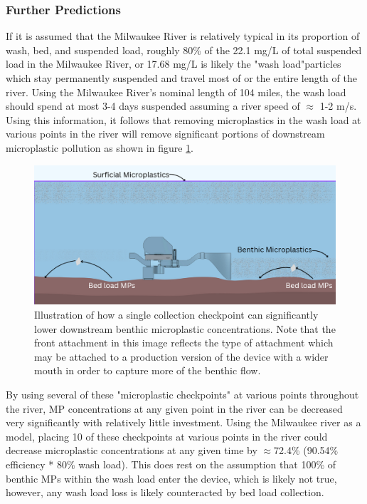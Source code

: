\documentclass[fleqn,10pt]{SelfArx} %
\begin{document}
	\subsubsection{Further Predictions}	
	If it is assumed that the Milwaukee River is relatively typical in its proportion of wash, bed, and suspended load, roughly 80\% of the 22.1 mg/L of total suspended load in the Milwaukee River, or 17.68 mg/L is likely the "wash load"\textemdash particles which stay permanently suspended and travel most of or the entire length of the river. Using the Milwaukee River's nominal length of 104 miles, the wash load should spend at most 3-4 days suspended assuming a river speed of $\approx$ 1-2 m/s. 
	\linebreak
	Using this information, it follows that removing microplastics in the wash load at various points in the river will remove significant portions of downstream microplastic pollution as shown in figure \ref{fig:washload}.
	\begin{figure}[h]
		\centering
		\includegraphics[width=1\linewidth]{Figures/WashLoadCollection}
		\caption[Wash Load MP Collection]{Illustration of how a single collection checkpoint can significantly lower downstream \gls{benthic} microplastic concentrations. Note that the front attachment in this image reflects the type of attachment which may be attached to a production version of the device with a wider mouth in order to capture more of the \gls{benthic} flow.}
		\label{fig:washload}
	\end{figure}
	By using several of these "microplastic checkpoints" at various points throughout the river, MP concentrations at any given point in the river can be decreased very significantly with relatively little investment. Using the Milwaukee river as a model, placing 10 of these checkpoints at various points in the river could decrease microplastic concentrations at any given time by $\approx$72.4\% (90.54\% efficiency * 80\% wash load). This does rest on the assumption that 100\% of \gls{benthic} MPs within the wash load enter the device, which is likely not true, however, any wash load loss is likely counteracted by bed load collection. 
	
\end{document}
